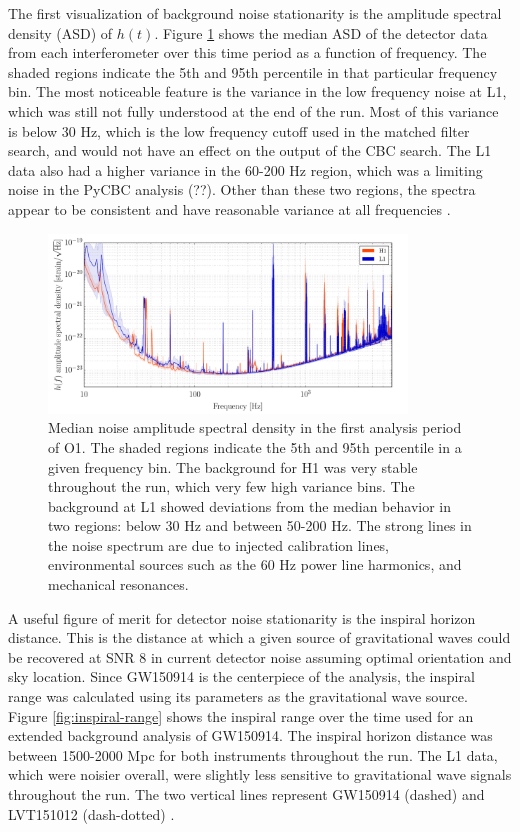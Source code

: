 The first
visualization of background noise stationarity is the amplitude
spectral density (ASD) of $h(t)$. Figure \ref{fig:median-asd}
shows the
median ASD of the detector data from each interferometer over this
time period as a function of frequency. The shaded regions indicate
the 5th and 95th percentile in that particular frequency bin.
The most noticeable feature is the variance in the low frequency
noise at L1, which was still not fully understood at the end of the run.
Most of this variance is below 30 Hz, which is the
low frequency cutoff used in the matched filter search, and would
not have an effect on the output of the CBC search. The L1 data
also had a higher variance in the 60-200 Hz region, which was a
limiting noise in the PyCBC analysis (??). Other than these two regions,
the spectra appear to be consistent and have reasonable variance
at all frequencies \cite{GW150914-DETCHAR}.

\begin{figure}[ht!]%
\includegraphics[width=0.85\textwidth]{figures/O1/H1L1-OBSERVING_GW150914_PERCENTILE_SPECTRUM-1126073342-3309798}
\caption[Median noise ASD in O1]{Median noise amplitude spectral density %
         in the first analysis period of O1. The shaded regions indicate %
         the 5th and 95th percentile in a given frequency bin. The background %
         for H1 was very stable throughout the run, which very few high %
         variance bins. The background at L1 showed deviations from the %
         median behavior in two regions: below 30 Hz and between 50-200 Hz. %
         The strong lines in the noise spectrum are due to injected calibration %
         lines, environmental sources such as the 60 Hz power line harmonics, %
         and mechanical resonances.
         }
\label{fig:median-asd}
\end{figure}

A useful figure of merit for detector noise stationarity is the
inspiral horizon distance. This is the distance at which a given source
of gravitational waves
could be recovered at SNR 8 in current detector noise assuming
optimal orientation and sky location. Since GW150914 is the
centerpiece of the analysis, the inspiral range was calculated using
its parameters as the gravitational wave source. Figure \ref{fig:inspiral-range}
shows
the inspiral range over the time used for an extended background
analysis of GW150914. The inspiral horizon distance was between 1500-2000 Mpc
for both instruments throughout the run. The L1 data, which were noisier overall,
were slightly less sensitive to
gravitational wave signals throughout the run. The two vertical lines
represent GW150914 (dashed) and LVT151012 (dash-dotted) \cite{GW150914-DETCHAR}.

